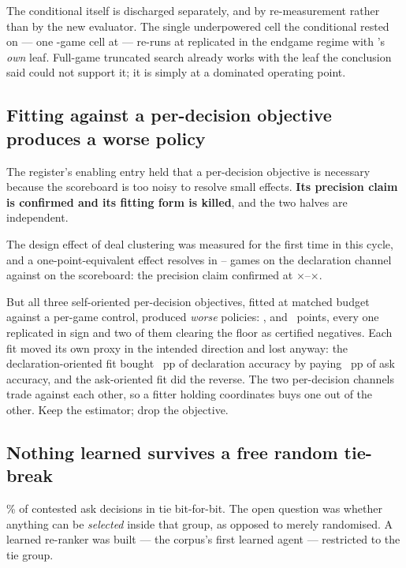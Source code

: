 The conditional itself is discharged separately, and by re-measurement rather than by the new
evaluator. The single underpowered cell the conditional rested on --- one \vsevenFullGameOldN{}-game cell at \vsevenFullGameOld{} --- re-runs at \vsevenTruncatedEndgame{} replicated in the endgame regime with
\vsix{}'s \emph{own} leaf. Full-game truncated search already works with the leaf the conclusion said
could not support it; it is simply at a dominated operating point.

\subsection{Fitting against a per-decision objective produces a worse policy}
\label{sec:rejected-perdecision}

The register's enabling entry held that a per-decision objective is necessary because the scoreboard
is too noisy to resolve small effects. \textbf{Its precision claim is confirmed and its fitting form
is killed}, and the two halves are independent.

The design effect of deal clustering was measured for the first time in this cycle, and a
one-point-equivalent effect resolves in \vsevenPerDecisionGamesLo{}--\vsevenPerDecisionGamesHi{} games
on the declaration channel against \vsevenScoreboardGames{} on the scoreboard: the precision claim
confirmed at \vsevenDesignEffectLo$\times$--\vsevenDesignEffectHi$\times$.

But all three self-oriented per-decision objectives, fitted at matched budget against a per-game
control, produced \emph{worse} policies: \vsevenKfourSelfDecl{}, \vsevenKfourSelfAsk{} and
\vsevenKfourSelfAlloc{}~points, every one replicated in sign and two of them clearing the floor as
certified negatives. Each fit moved its own proxy in the intended direction and lost anyway:
the declaration-oriented fit bought \vsevenKfourTradeGain{}~pp of declaration accuracy by paying
\vsevenKfourTradeCost{}~pp of ask accuracy, and the ask-oriented fit did the reverse. The two
per-decision channels trade against each other, so a fitter holding \vsevenCoordinates{} coordinates buys one out of the other. Keep the estimator; drop the objective.

\subsection{Nothing learned survives a free random tie-break}
\label{sec:rejected-tie}

\vsevenTieContested\% of contested ask decisions in \vsix{} tie bit-for-bit. The open question was
whether anything can be \emph{selected} inside that group, as opposed to merely randomised. A learned
re-ranker was built --- the corpus's first learned agent --- restricted to the tie group.

